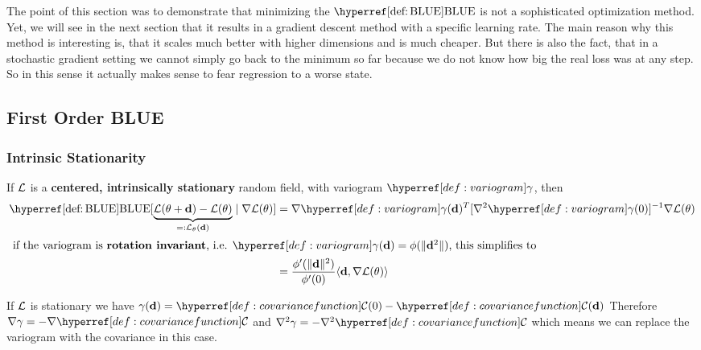 The point of this section was to demonstrate that minimizing the
\(\BLUE\) is not a sophisticated optimization method. Yet, we will see in the
next section that it results in a gradient descent method with a specific
learning rate. The main reason why this method is interesting is, that it scales
much better with higher dimensions and is much cheaper. But there is also the
fact, that in a stochastic gradient setting we cannot simply go back to
the minimum so far because we do not know how big the real loss was at any step.
So in this sense it actually makes sense to fear regression to a worse state.

\subsection{First Order BLUE}

\subsubsection{Intrinsic Stationarity}

\begin{lemma}\label{lem: blue centered, intrinsically stationary}
	If \(\mathcal{L}\) is a \textbf{centered, intrinsically stationary} random field,
	with variogram \(\variogram\), then
	\begin{align*}
		\BLUE[\underbrace{\Loss(\param+\step) - \Loss(\param)}_{=:\Loss_\param(\step)}
		\mid \nabla\Loss(\param)]
		&=  \nabla\variogram(\step)^T[\nabla^2\variogram(0)]^{-1}
		\nabla\Loss(\param)\\
		\intertext{
			if the variogram is \textbf{rotation invariant}, i.e.
			\(\variogram(\step)=\phi(\|\step^2\|)\), this simplifies to
		}
		&= \frac{\phi'(\|\step\|^2)}{\phi'(0)}
		\langle \step, \nabla\Loss(\param)\rangle
	\end{align*}
\end{lemma}
\begin{remark}
	If \(\mathcal{L}\) is stationary we have \(\gamma(\step) = \C(0) - \C(\step)\)
	Therefore \(\nabla\gamma = - \nabla\C\) and \(\nabla^2\gamma = -\nabla^2\C\)
	which means we can replace the variogram with the covariance in this case.
\end{remark}


